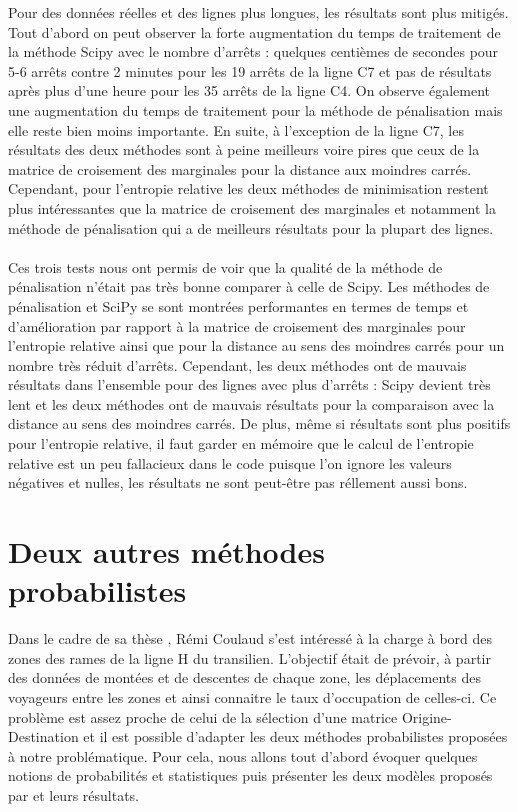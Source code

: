 \documentclass[12pt]{article}
\begin{document}
Pour des données réelles et des lignes plus longues, les résultats sont plus mitigés.\\ Tout d'abord on peut observer la forte augmentation du temps de traitement de la méthode Scipy avec le nombre d'arrêts : quelques centièmes de secondes pour 5-6 arrêts contre 2 minutes pour les 19 arrêts de la ligne C7 et pas de résultats après plus d'une heure pour les 35 arrêts de la ligne C4. On observe également une augmentation du temps de traitement pour la méthode de pénalisation mais elle reste bien moins importante. En suite, à l'exception de la ligne C7, les résultats des deux méthodes sont à peine meilleurs voire pires que ceux de la matrice de croisement des marginales pour la distance aux moindres carrés. Cependant, pour l'entropie relative les deux méthodes de minimisation restent plus intéressantes que la matrice de croisement des marginales et notamment la méthode de pénalisation qui a de meilleurs résultats pour la plupart des lignes. \\
\\
Ces trois tests nous ont permis de voir que la qualité de la méthode de pénalisation n'était pas très bonne comparer à celle de Scipy. Les méthodes de pénalisation et SciPy se sont montrées performantes en termes de temps et d'amélioration par rapport à la matrice de croisement des marginales pour l'entropie relative ainsi que pour la distance au sens des moindres carrés pour un nombre très réduit d'arrêts. Cependant, les deux méthodes ont de mauvais résultats dans l'ensemble pour des lignes avec plus d'arrêts : Scipy devient très lent et les deux méthodes ont de mauvais résultats pour la comparaison avec la distance au sens des moindres carrés. De plus, même si résultats sont plus positifs pour l'entropie relative, il faut garder en mémoire que le calcul de l'entropie relative est un peu fallacieux dans le code puisque l'on ignore les valeurs négatives et nulles, les résultats ne sont peut-être pas réllement aussi bons.
\section{Deux autres méthodes probabilistes}
Dans le cadre de sa thèse \cite{these_remi_coulaud}, Rémi Coulaud s'est intéressé à la charge à bord des zones des rames de la ligne H du transilien. L'objectif était de prévoir, à partir des données de montées et de descentes de chaque zone, les déplacements des voyageurs entre les zones et ainsi connaitre le taux d'occupation de celles-ci. Ce problème est assez proche de celui de la sélection d'une matrice Origine-Destination et il est possible d'adapter les deux méthodes probabilistes proposées à notre problématique. Pour cela, nous allons tout d'abord évoquer quelques notions de probabilités et statistiques \cite{poly_françois} puis présenter les deux modèles proposés par \cite{these_remi_coulaud} et leurs résultats.
\end{document}
